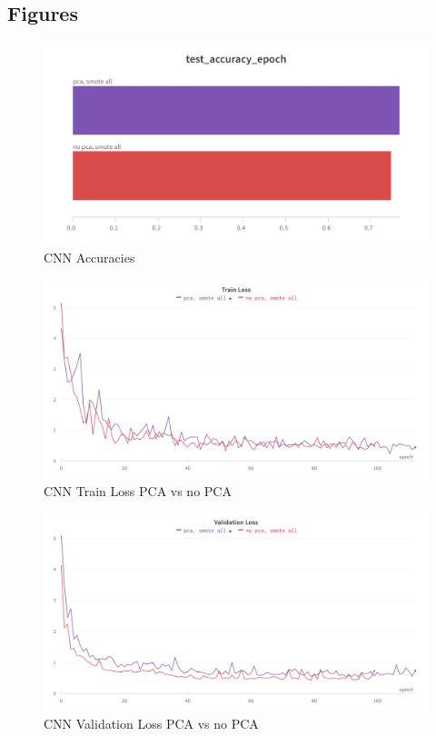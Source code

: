 \documentclass[12pt,a4paper]{article}
\begin{document}
    \clearpage
    \subsection{Figures}
    \begin{figure}[h]
        \centering
        \includegraphics[height=0.3\textheight]{cnn-test-acc}
        \caption{CNN Accuracies}
        \label{fig:cnn-test-acc}
    \end{figure}

    \begin{figure}[h]
        \centering
        \includegraphics[height=0.3\textheight]{pca-train-loss}
        \caption{CNN Train Loss PCA vs no PCA}
        \label{fig:cnn-train-loss}
    \end{figure}

    \begin{figure}[h]
        \centering
        \includegraphics[height=0.3\textheight]{smote-all-val-loss}
        \caption{CNN Validation Loss PCA vs no PCA}
        \label{fig:cnn-val-loss}
    \end{figure}
\end{document}
